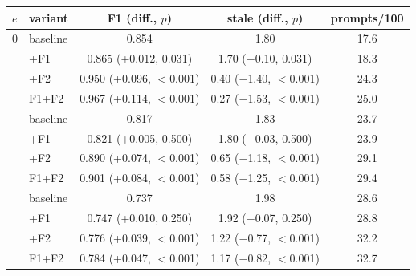 \begin{tabular}{llccc}
\toprule
$e$ & variant & F1 (diff., $p$) & stale (diff., $p$) & prompts/100 \\
\midrule
0 & baseline & 0.854 & 1.80 & 17.6 \\
 & +F1 & 0.865 (+0.012, 0.031) & 1.70 ($-$0.10, 0.031) & 18.3 \\
 & +F2 & 0.950 (+0.096, \ensuremath{<}0.001) & 0.40 ($-$1.40, \ensuremath{<}0.001) & 24.3 \\
 & F1+F2 & 0.967 (+0.114, \ensuremath{<}0.001) & 0.27 ($-$1.53, \ensuremath{<}0.001) & 25.0 \\
\addlinespace[2pt]
0.1 & baseline & 0.817 & 1.83 & 23.7 \\
 & +F1 & 0.821 (+0.005, 0.500) & 1.80 ($-$0.03, 0.500) & 23.9 \\
 & +F2 & 0.890 (+0.074, \ensuremath{<}0.001) & 0.65 ($-$1.18, \ensuremath{<}0.001) & 29.1 \\
 & F1+F2 & 0.901 (+0.084, \ensuremath{<}0.001) & 0.58 ($-$1.25, \ensuremath{<}0.001) & 29.4 \\
\addlinespace[2pt]
0.2 & baseline & 0.737 & 1.98 & 28.6 \\
 & +F1 & 0.747 (+0.010, 0.250) & 1.92 ($-$0.07, 0.250) & 28.8 \\
 & +F2 & 0.776 (+0.039, \ensuremath{<}0.001) & 1.22 ($-$0.77, \ensuremath{<}0.001) & 32.2 \\
 & F1+F2 & 0.784 (+0.047, \ensuremath{<}0.001) & 1.17 ($-$0.82, \ensuremath{<}0.001) & 32.7 \\
\bottomrule
\end{tabular}
